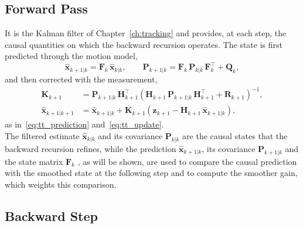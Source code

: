 \subsection{Forward Pass}
\label{subsec:rts_forward}

 It is the Kalman filter of
Chapter~\ref{ch:tracking} and provides, at each step, the causal quantities on which the
backward recursion operates. The state is first predicted through the motion model,
\begin{equation}
    \hat{\mathbf{x}}_{k+1|k} = \mathbf{F}_k\,\hat{\mathbf{x}}_{k|k},
    \qquad
    \mathbf{P}_{k+1|k} = \mathbf{F}_k\,\mathbf{P}_{k|k}\,\mathbf{F}_k^\top + \mathbf{Q}_k,
    \label{eq:rts_fwd_pred}
\end{equation}
and then corrected with the measurement,
\begin{equation}
    \begin{aligned}
        \mathbf{K}_{k+1} &= \mathbf{P}_{k+1|k}\,\mathbf{H}_{k+1}^\top
        \left(\mathbf{H}_{k+1}\,\mathbf{P}_{k+1|k}\,\mathbf{H}_{k+1}^\top + \mathbf{R}_{k+1}\right)^{-1}, \\
        \hat{\mathbf{x}}_{k+1|k+1} &= \hat{\mathbf{x}}_{k+1|k}
        + \mathbf{K}_{k+1}\left(\mathbf{z}_{k+1} - \mathbf{H}_{k+1}\,\hat{\mathbf{x}}_{k+1|k}\right),
    \end{aligned}
    \label{eq:rts_fwd_corr}
\end{equation}
as in~\eqref{eq:tt_prediction} and~\eqref{eq:tt_update}. \\ The filtered estimate $\hat{\mathbf{x}}_{k|k}$ and its covariance
$\mathbf{P}_{k|k}$ are the causal states that the backward recursion refines, while the
prediction $\hat{\mathbf{x}}_{k+1|k}$, its covariance $\mathbf{P}_{k+1|k}$ and the state
matrix $\mathbf{F}_k$ , as will be shown, are used to compare the causal prediction with the smoothed state at
the following step and to compute the smoother gain, which weights this comparison. 

\subsection{Backward Step}
\label{subsec:rts_backward}

